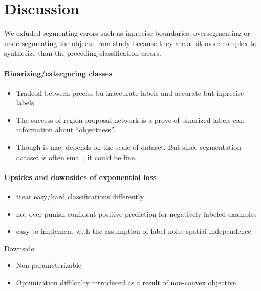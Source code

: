 \section{Discussion}
\label{sec:discussion}

We exluded segmenting errors such as inprecise boundaries, oversegmenting or undersegmenting the objects from study because they are a bit more complex to synthesize than the preceding classification errors.

\paragraph{Binarizing/catergoring classes}
\begin{itemize}
  \item Tradeoff between precise bu inaccurate labels and accurate but inprecise labels
  \item The success of region proposal network is a prove of binarized labels can information about ``objectness''.
  \item Though it may depends on the scale of dataset. But since segmentation dataset is often small, it could be fine.
\end{itemize}

\paragraph{Upsides and downsides of exponential loss}
\begin{itemize}
  \item treat easy/hard classifications differently
  \item not over-punish confident positive prediction for negatively labeled examples
  \item easy to implement with the assumption of label noise spatial independence
\end{itemize}


Downside:
\begin{itemize}
  \item Non-parameterizable
  \item Optimization diffilculty introduced as a result of non-convex objective
\end{itemize}


